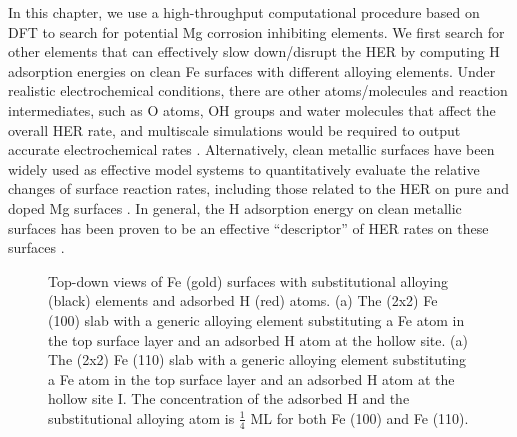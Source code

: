 In this chapter, we use a high-throughput computational procedure based on \ac{DFT} to search for potential Mg corrosion inhibiting elements. We first search for other elements that can effectively slow down/disrupt the \ac{HER} by computing H adsorption energies on clean Fe surfaces with different alloying elements. Under realistic electrochemical conditions, there are other atoms/molecules and reaction intermediates, such as O atoms, OH groups and water molecules that affect the overall \ac{HER} rate, and multiscale simulations would be required to output accurate electrochemical rates \cite{qi2012adsorbate}. Alternatively, clean metallic surfaces have been widely used as effective model systems to quantitatively evaluate the relative changes of surface reaction rates, including those related to the \ac{HER} on pure and doped Mg surfaces \cite{williams2016modeling,pozzo2009hydrogen}. In general, the H adsorption energy on clean metallic surfaces has been proven to be an effective ``descriptor'' of \ac{HER} rates on these surfaces \cite{greeley2006computational}.

\newpage
\begingroup
\begin{figure}[!ht]
  \centering
  \label{Chap:Mg_H:fig:3a}
  \label{Chap:Mg_H:fig:3b}
\caption[Top-down views of Fe surfaces with substitutional alloying elements and adsorbed H atoms]{Top-down views of Fe (gold) surfaces with substitutional alloying (black) elements and adsorbed H (red) atoms. (a) The (2x2) Fe (100) slab with a generic alloying element substituting a Fe atom in the top surface layer and an adsorbed H atom at the hollow site. (a) The (2x2) Fe (110) slab with a generic alloying element substituting a Fe atom in the top surface layer and an adsorbed H atom at the hollow site I. The concentration of the adsorbed H and the substitutional alloying atom is $\frac{1}{4}$ \ac{ML} for both Fe (100) and Fe (110).}
  \label{Chap:Mg_H:fig3}
\end{figure}
\endgroup